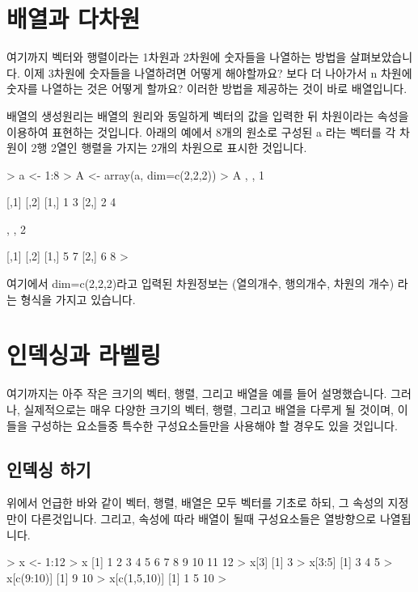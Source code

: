 \documentclass{book}
\begin{document}
\section{배열과 다차원} 

여기까지 벡터와 행렬이라는 1차원과 2차원에 숫자들을 나열하는 방법을 살펴보았습니다.
이제 3차원에 숫자들을 나열하려면 어떻게 해야할까요? 
보다 더 나아가서 n 차원에 숫자를 나열하는 것은 어떻게 할까요?
이러한 방법을 제공하는 것이 바로 배열입니다. 

배열의 생성원리는 배열의 원리와 동일하게 벡터의 값을 입력한 뒤 차원이라는 속성을 이용하여 표현하는 것입니다.
아래의 예에서 8개의 원소로 구성된 a 라는 벡터를 각 차원이 2행 2열인 행렬을 가지는 2개의 차원으로 표시한 것입니다. 

\begin{Schunk}
\begin{Soutput}
> a <- 1:8
> A <- array(a, dim=c(2,2,2))
> A 
, , 1

     [,1] [,2]
[1,]    1    3
[2,]    2    4

, , 2

     [,1] [,2]
[1,]    5    7
[2,]    6    8
>
\end{Soutput}
\end{Schunk}

여기에서 dim=c(2,2,2)라고 입력된 차원정보는 (열의개수, 행의개수, 차원의 개수) 라는 형식을 가지고 있습니다. 


\section{인덱싱과 라벨링}

여기까지는 아주 작은 크기의 벡터, 행렬, 그리고 배열을 예를 들어 설명했습니다.
그러나, 실제적으로는 매우 다양한 크기의 벡터, 행렬, 그리고 배열을 다루게 될 것이며, 이들을 구성하는 요소들중 특수한 구성요소들만을 사용해야 할 경우도 있을 것입니다.  

\subsection{인덱싱 하기}

위에서 언급한 바와 같이 벡터, 행렬, 배열은 모두 벡터를 기초로 하되, 그 속성의 지정만이 다른것입니다.
그리고, 속성에 따라 배열이 될때 구성요소들은 열방향으로 나열됩니다. 


\begin{Schunk}
\begin{Soutput}
> x <- 1:12
> x
 [1]  1  2  3  4  5  6  7  8  9 10 11 12
> x[3]
[1] 3
> x[3:5]
[1] 3 4 5
> x[c(9:10)]
[1]  9 10
> x[c(1,5,10)]
[1]  1  5 10
>
\end{Soutput}
\end{Schunk}
\end{document}
